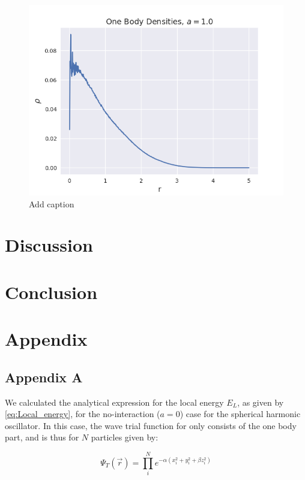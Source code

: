 \documentclass[norsk,a4paper,12pt]{article}
\begin{document}
\begin{figure} [H]
    \centering
    \includegraphics[scale=0.65]{images/ob_a_1.png}
    \caption{Add caption}
    \label{fig:ob1}
\end{figure} 

\section{Discussion}

\section{Conclusion}

\section{Appendix}
\subsection{Appendix A}
\label{appendix_A}

We calculated the analytical expression for the local energy $E_L$, as given by \ref{eq:Local_energy}, for the no-interaction ($a=0$) case for the spherical harmonic oscillator. In this case, the wave trial function for only consists of the one body part, and is thus for $N$ particles given by:

\begin{equation}
	\label{eq:WF_nointeract}
	\Psi_T(\vec{r}) = \prod_i^N e^{-\alpha(x_i^2 + y_i^2 + \beta z_i^2)}
\end{equation}
\end{document}
